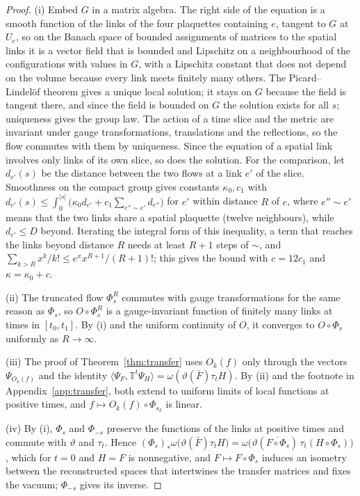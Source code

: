 \documentclass[11pt]{amsart}
\theoremstyle{definition}
\theoremstyle{remark}
\numberwithin{equation}{section}
\newcommand{\ip}[2]{\langle #1,#2\rangle}
\begin{document}
\begin{proof}
(i) Embed $G$ in a matrix algebra. The right side of the equation is a smooth
function of the links of the four plaquettes containing $e$, tangent to $G$
at $U_e$, so on the Banach space of bounded assignments of matrices to the
spatial links it is a vector field that is bounded and Lipschitz on a
neighbourhood of the configurations with values in $G$, with a Lipschitz
constant that does not depend on the volume because every link meets
finitely many others. The Picard--Lindel\"of theorem gives a unique local
solution; it stays on $G$ because the field is tangent there, and since the
field is bounded on $G$ the solution exists for all $s$; uniqueness gives the
group law. The action of a time slice and the metric are invariant under
gauge transformations, translations and the reflections, so the flow
commutes with them by uniqueness. Since the equation of a spatial link
involves only links of its own slice, so does the solution. For the
comparison, let $d_{e'}(s)$ be the distance between the two flows at a link
$e'$ of the slice. Smoothness on the compact group gives constants $\kappa_0,c_1$ with
$d_{e'}(s)\le\int_0^{|s|}\bigl(\kappa_0d_{e'}+c_1\sum_{e''\sim e'}d_{e''}\bigr)$
for $e'$ within
distance $R$ of $e$, where $e''\sim e'$ means that the two links share a
spatial plaquette (twelve neighbours), while $d_{e'}\le D$ beyond. Iterating
the integral form of this inequality, a term that reaches the links beyond
distance $R$ needs at least $R+1$ steps of $\sim$, and
$\sum_{k>R}x^k/k!\le e^xx^{R+1}/(R+1)!$; this gives the bound with $c=12c_1$
and $\kappa=\kappa_0+c$.

(ii) The truncated flow $\Phi^R_s$ commutes with gauge transformations for the
same reason as $\Phi_s$, so $O\circ\Phi^R_s$ is a gauge-invariant function of
finitely many links at times in $[t_0,t_1]$. By (i) and the uniform
continuity of $O$, it converges to $O\circ\Phi_s$ uniformly as $R\to\infty$.

(iii) The proof of Theorem~\ref{thm:transfer} uses $O_k(f)$ only through the
vectors $\Psi_{O_k(f)}$ and the identity
$\ip{\Psi_F}{\mathbb T^t\Psi_H}=\omega(\vartheta(\bar F)\tau_tH)$. By (ii) and the
footnote in Appendix~\ref{app:transfer}, both extend to uniform limits of
local functions at positive times, and $f\mapsto O_k(f)\circ\Phi_{s_k}$ is
linear.

(iv) By (i), $\Phi_s$ and $\Phi_{-s}$ preserve the functions of the links at
positive times and commute with $\vartheta$ and $\tau_t$. Hence
$(\Phi_s)_*\omega\bigl(\vartheta(\bar F)\tau_tH\bigr)=\omega\bigl(\vartheta(\overline{F\circ
\Phi_s})\,\tau_t(H\circ\Phi_s)\bigr)$, which for $t=0$ and $H=F$ is
nonnegative, and $F\mapsto F\circ\Phi_s$ induces an isometry between the
reconstructed spaces that intertwines the transfer matrices and fixes the
vacuum; $\Phi_{-s}$ gives its inverse.
\end{proof}
\end{document}
